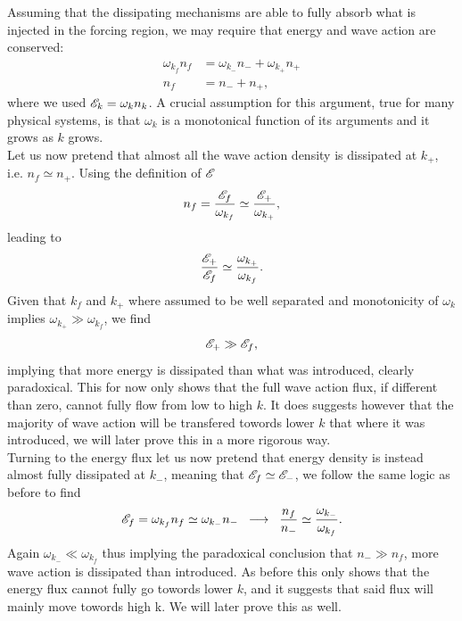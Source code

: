 Assuming that the dissipating mechanisms are able to fully absorb what is injected in the forcing region, we may require that energy and wave action are conserved:
\begin{align}
    \omega_{k_f}n_f &=  \omega_{k_-}n_- + \omega_{k_+}n_+ \\
    n_f &= n_- + n_+,
\end{align}
where we used $\mathscr{E}_k = \omega_k n_k$. A crucial assumption for this argument, true for many physical systems, is that $\omega_k$ is a monotonical function 
of its arguments and it grows as $k$ grows.\\
Let us now pretend that almost all the wave action density is dissipated at $k_+$, i.e. $n_f \simeq n_+$. Using the definition of $\mathscr{E}$ 
\begin{equation}
    n_f = \frac{\mathscr{E}_f}{\omega_{k_f}} \simeq \frac{\mathscr{E}_+}{\omega_{k_+}},
\end{equation}
leading to 
\begin{equation}
    \frac{\mathscr{E}_+}{\mathscr{E}_f} \simeq \frac{\omega_{k_+}}{\omega_{k_f}}.
\end{equation}
Given that $k_f$ and $k_+$ where assumed to be well separated and monotonicity of $\omega_k$ implies $\omega_{k_+} \gg \omega_{k_f}$, we find 
\begin{equation}
    \mathscr{E}_+ \gg \mathscr{E}_f,
\end{equation}
implying that more energy is dissipated than what was introduced, clearly paradoxical. This for now only shows that the full wave action flux, if different than zero, cannot 
fully flow from low to high $k$. It does suggests however that the majority of wave action will be transfered towords lower $k$ that where it was introduced, we will 
later prove this in a more rigorous way. \\
Turning to the energy flux let us now pretend that energy density is instead almost fully dissipated at $k_-$, meaning that $\mathscr{E}_f \simeq \mathscr{E}_-$, we follow the same 
logic as before to find
\begin{equation}
    \mathscr{E}_f = \omega_{k_f}n_f \simeq \omega_{k_-}n_- \hspace{2mm} \longrightarrow \hspace{2mm} \frac{n_f}{n_-} \simeq \frac{\omega_{k_-}}{\omega_{k_f}}.
\end{equation}   
Again $\omega_{k_-} \ll \omega_{k_f}$ thus implying the paradoxical conclusion that $n_- \gg n_f$, more wave action is dissipated than introduced. As before this only 
shows that the energy flux cannot fully go towords lower $k$, and it suggests that said flux will mainly move towords high k. We will later prove this as well. \\
